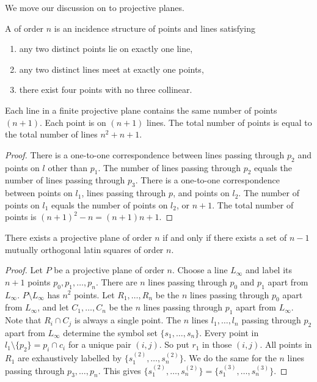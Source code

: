 We move our discussion on to projective planes.

\begin{definition}
    A  of order $n$ is an incidence structure of points and lines satisfying
    \begin{enumerate}
        \item any two distinct points lie on exactly one line,
        \item any two distinct lines meet at exactly one points,
        \item there exist four points with no three collinear.
    \end{enumerate}
\end{definition}

\begin{lemma}
    Each line in a finite projective plane contains the same number of points $(n+1)$. Each point is on $(n+1)$ lines. The total number of points is equal to the total number of lines $n^{2}+n+1$.
\end{lemma}
\begin{proof}
    There is a one-to-one correspondence between lines passing through $p_{2}$ and points on $l$ other than $p_{1}$. The number of lines passing through $p_{2}$ equals the number of lines passing through $p_{3}$. There is a one-to-one correspondence between points on $l_{1}$, lines passing through $p$, and points on $l_{2}$. The number of points on $l_{1}$ equals the number of points on $l_{2}$, or $n+1$. The total number of points is $(n+1)^{2}-n = (n+1)n + 1$.
\end{proof}

\begin{theorem}
    There exists a projective plane of order $n$ if and only if there exists a set of $n-1$ mutually orthogonal latin squares of order $n$.
\end{theorem}

\begin{proof}
    Let $P$ be a projective plane of order $n$. Choose a line $L_{\infty}$ and label its $n+1$ points $p_{0},p_{1},\ldots,p_{n}$. There are $n$ lines passing through $p_{0}$ and $p_{1}$ apart from $L_{\infty}$. $P \setminus L_{\infty}$ has $n^{2}$ points. Let $R_{1},\ldots,R_{n}$ be the $n$ lines passing through $p_{0}$ apart from $L_{\infty}$, and let $C_{1},\ldots,C_{n}$ be the $n$ lines passing through $p_{1}$ apart from $L_{\infty}$. Note that $R_{i} \cap C_{j}$ is always a single point. The $n$ lines $l_{1},\ldots,l_{n}$ passing through $p_{2}$ apart from $L_{\infty}$ determine the symbol set $\{s_{1},\ldots,s_{n}\}$. Every point in $l_{1} \setminus \{p_{2}\} = p_{i} \cap c_{i}$ for a unique pair $(i,j)$. So put $r_{1}$ in those $(i,j)$. All points in $R_{1}$ are exhaustively labelled by $\{s_{1}^{(2)},\ldots,s_{n}^{(2)}\}$. We do the same for the $n$ lines passing through $p_{3},\ldots,p_{n}$. This gives $\{s_{1}^{(2)},\ldots,s_{n}^{(2)}\} = \{s_{1}^{(3)},\ldots,s_{n}^{(3)}\}$.
\end{proof}



